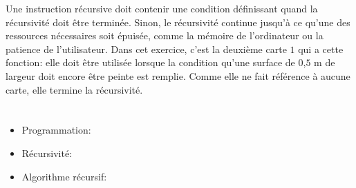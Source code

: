 {{Une instruction récursive doit contenir une condition définissant quand la récursivité doit être terminée. Sinon, le récursivité continue jusqu’à ce qu’une des ressources nécessaires soit épuisée, comme la mémoire de l’ordinateur ou la patience de l’utilisateur. Dans cet exercice, c’est la deuxième carte $1$ qui a cette fonction: elle doit être utilisée lorsque la condition qu’une surface de $0$,$5$ m de largeur doit encore être peinte est remplie. Comme elle ne fait référence à aucune carte, elle termine la récursivité.



\section*{\BrochureWebsitesAndKeywords}
{\raggedright
\begin{itemize}
  \item Programmation: \href{https://fr.wikipedia.org/wiki/Programmation_informatique}{}
  \item Récursivité: \href{https://fr.wikipedia.org/wiki/R\%C3\%A9cursivit\%C3\%A9}{}
  \item Algorithme récursif: \href{https://fr.wikipedia.org/wiki/Algorithme_r\%C3\%A9cursif}{}
\end{itemize}


}

}{}

\def\AuthorFutschekG{} %
\def\AuthorBaumannW{} %
\def\AuthorWeigendM{} %
\def\AuthorPohlW{} %
\def\AuthorHeinH{} %
\def\AuthorDatzkoThutS{} %
\def\AuthorDagieneV{} %
\def\AuthorAkhmetovN{} %
\def\AuthorSchrijversE{} %
\def\AuthorMorpurgoA{} %
\def\AuthorRoffeyC{} %
\def\AuthorPelletE{} %

\newpage}{}

